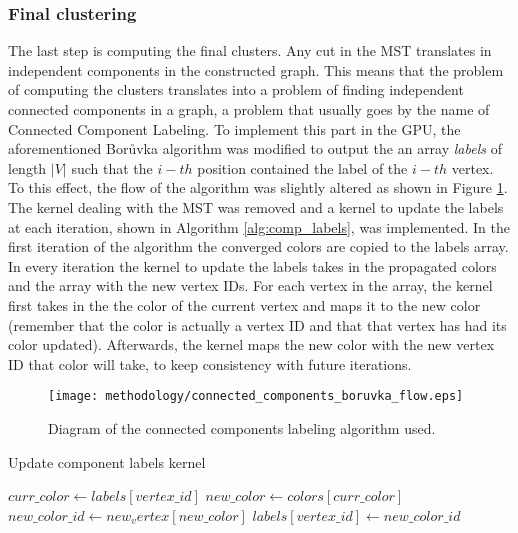 \subsubsection{Final clustering}
The last step is computing the final clusters.
Any cut in the MST translates in independent components in the constructed graph.
This means that the problem of computing the clusters translates into a problem of finding independent connected components in a graph, a problem that usually goes by the name of Connected Component Labeling.
To implement this part in the GPU, the aforementioned Borůvka algorithm was modified to output the an array \emph{labels} of length $|V|$ such that the $i-th$ position contained the label of the $i-th$ vertex.
To this effect, the flow of the algorithm was slightly altered as shown in Figure \ref{fig:connected comps flow}. 
The kernel dealing with the MST was removed and a kernel to update the labels at each iteration, shown in Algorithm \ref{alg:comp_labels}, was implemented.
In the first iteration of the algorithm the converged colors are copied to the labels array.
In every iteration the kernel to update the labels takes in the propagated colors and the array with the new vertex IDs.
For each vertex in the array, the kernel first takes in the the color of the current vertex and maps it to the new color (remember that the color is actually a vertex ID and that that vertex has had its color updated).
Afterwards, the kernel maps the new color with the new vertex ID that color will take, to keep consistency with future iterations.

\begin{figure}[hbtp]
\centering
\texttt{[image: methodology/connected\_components\_boruvka\_flow.eps]}
\caption{Diagram of the connected components labeling algorithm used.}
\label{fig:connected comps flow}
\end{figure}


%
%


\begin{algorithm}
\caption{Update component labels kernel}\label{alg:comp_labels}
\begin{algorithmic}[1]
\State $curr\_color \gets labels[vertex\_id]$
\State $new\_color \gets colors[curr\_color]$
\State $new\_color\_id \gets new_vertex[new\_color]$
\State $labels[vertex\_id] \gets new\_color\_id$
\EndProcedure
\end{algorithmic}
\end{algorithm}



